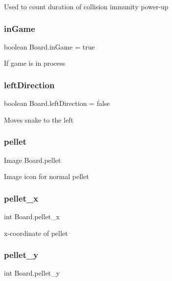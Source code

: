 Used to count duration of collision immunity power-\/up \mbox{\label{class_board_ab0bb999b1b53db2a2d157003dece54ab}} 
\subsubsection{\texorpdfstring{in\+Game}{inGame}}
{\footnotesize\ttfamily boolean Board.\+in\+Game = true}

If game is in process \mbox{\label{class_board_a07aa50c4b704777f8693a35b319ada03}} 
\subsubsection{\texorpdfstring{left\+Direction}{leftDirection}}
{\footnotesize\ttfamily boolean Board.\+left\+Direction = false}

Moves snake to the left \mbox{\label{class_board_a9fd625fd3b6a4cd34d32e9ecc9c7163f}} 
\subsubsection{\texorpdfstring{pellet}{pellet}}
{\footnotesize\ttfamily Image Board.\+pellet}

Image icon for normal pellet \mbox{\label{class_board_ad10f2e196700bf4db295150b320b1f07}} 
\subsubsection{\texorpdfstring{pellet\+\_\+x}{pellet\_x}}
{\footnotesize\ttfamily int Board.\+pellet\+\_\+x}

x-\/coordinate of pellet \mbox{\label{class_board_a9ef3d56a9df039b5b1c6a7172e77d233}} 
\subsubsection{\texorpdfstring{pellet\+\_\+y}{pellet\_y}}
{\footnotesize\ttfamily int Board.\+pellet\+\_\+y}

